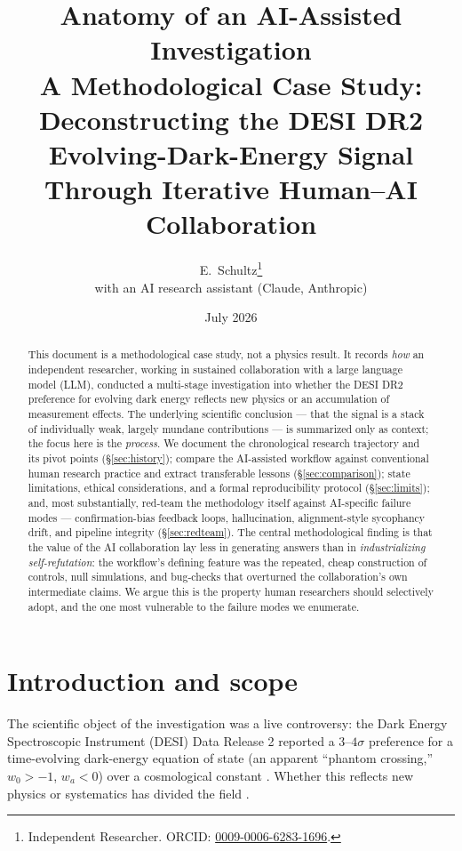 \documentclass[11pt]{article}
\title{\vspace{-2em}\textbf{Anatomy of an AI-Assisted Investigation}\\[0.35em]
\large A Methodological Case Study: Deconstructing the DESI DR2\\
Evolving-Dark-Energy Signal Through Iterative Human--AI Collaboration}
\author{E.~Schultz\thanks{Independent Researcher. ORCID: \href{https://orcid.org/0009-0006-6283-1696}{0009-0006-6283-1696}.}\\[0.3em]
\normalsize with an AI research assistant (Claude, Anthropic)}
\date{July 2026}
\newcommand{\wo}{\ensuremath{w_0}}
\newcommand{\wa}{\ensuremath{w_a}}
\begin{document}
\maketitle
\thispagestyle{fancy}

\begin{abstract}
\noindent This document is a methodological case study, not a physics result. It records \emph{how} an independent researcher, working in sustained collaboration with a large language model (LLM), conducted a multi-stage investigation into whether the DESI DR2 preference for evolving dark energy reflects new physics or an accumulation of measurement effects. The underlying scientific conclusion --- that the signal is a stack of individually weak, largely mundane contributions --- is summarized only as context; the focus here is the \emph{process}. We document the chronological research trajectory and its pivot points (\S\ref{sec:history}); compare the AI-assisted workflow against conventional human research practice and extract transferable lessons (\S\ref{sec:comparison}); state limitations, ethical considerations, and a formal reproducibility protocol (\S\ref{sec:limits}); and, most substantially, red-team the methodology itself against AI-specific failure modes --- confirmation-bias feedback loops, hallucination, alignment-style sycophancy drift, and pipeline integrity (\S\ref{sec:redteam}). The central methodological finding is that the value of the AI collaboration lay less in generating answers than in \emph{industrializing self-refutation}: the workflow's defining feature was the repeated, cheap construction of controls, null simulations, and bug-checks that overturned the collaboration's own intermediate claims. We argue this is the property human researchers should selectively adopt, and the one most vulnerable to the failure modes we enumerate.
\end{abstract}

\tableofcontents
\vspace{1em}

\section{Introduction and scope}

The scientific object of the investigation was a live controversy: the Dark Energy Spectroscopic Instrument (DESI) Data Release 2 reported a $3$--$4\sigma$ preference for a time-evolving dark-energy equation of state (an apparent ``phantom crossing,'' $\wo>-1$, $\wa<0$) over a cosmological constant \citep{desidr2}. Whether this reflects new physics or systematics has divided the field \citep{huang,vincenzi,colgain}.
\end{document}
